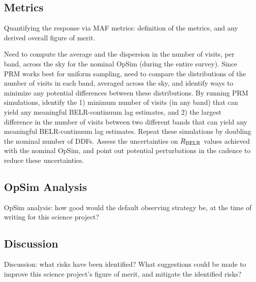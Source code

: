 
\subsection{Metrics}
\label{sec:\secname:metrics}

Quantifying the response via MAF metrics: definition of the metrics,
and any derived overall figure of merit.


Need to compute the average and the dispersion in the
number of visits, per band, across the sky for the nominal OpSim
(during the entire survey). Since PRM works best for uniform sampling,
need to compare the distributions of the number of visits in each
band, averaged across the sky, and identify ways to minimize any
potential differences between these distributions. By running PRM
simulations, identify the 1) minimum number of visits (in any band)
that can yield any meaningful BELR-continuum lag estimates, and 2) the
largest difference in the number of visits between two different bands
that can yield any meaningful BELR-continuum lag estimates. Repeat
these simulations by doubling the nominal number of DDFs. Assess the
uncertainties on $R_{\rm BELR}$ values achieved with the nominal OpSim,
and point out potential perturbations in the cadence to reduce these
uncertainties.


\subsection{OpSim Analysis}
\label{sec:\secname:analysis}

OpSim analysis: how good would the default observing strategy be, at
the time of writing for this science project?



\subsection{Discussion}
\label{sec:\secname:discussion}

Discussion: what risks have been identified? What suggestions could be
made to improve this science project's figure of merit, and mitigate
the identified risks?



\navigationbar
